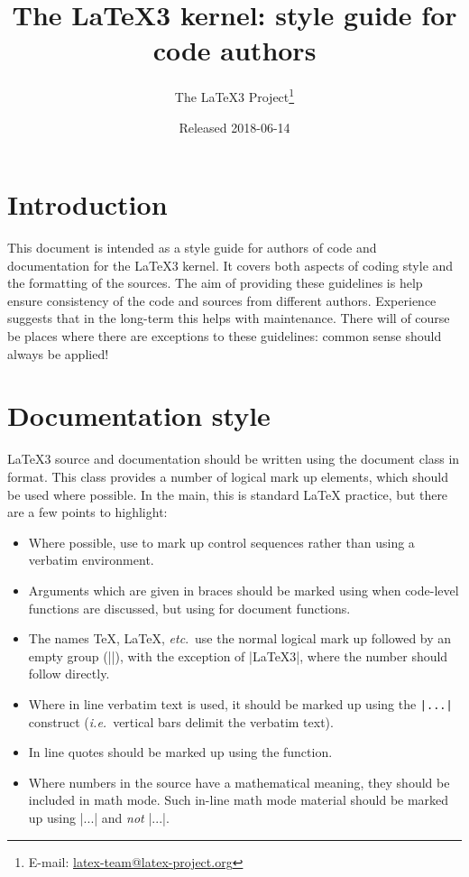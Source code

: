 \documentclass{l3doc}
\title{%
  The \LaTeX3 kernel: style guide for code authors%
}
\author{%
  The \LaTeX3 Project\thanks
    {%
      E-mail:
      \href{mailto:latex-team@latex-project.org}%
        {latex-team@latex-project.org}%
    }%
}
\date{Released 2018-06-14}
\begin{document}
\maketitle

\tableofcontents

\section{Introduction}

This document is intended as a style guide for authors of code and
documentation for the \LaTeX3 kernel. It covers both aspects of coding
style and the formatting of the sources. The aim of providing these
guidelines is help ensure consistency of the code and sources from
different authors. Experience suggests that in the long-term this helps
with maintenance. There will of course be places where there are
exceptions to these guidelines: common sense should always be
applied!

\section{Documentation style}

\LaTeX3 source and documentation should be written using the document
class  in  format. This class provides a number
of logical mark up elements, which should be used where possible.
In the main, this is standard \LaTeX{} practice, but there are a
few points to highlight:
\begin{itemize}
  \item
    Where possible, use  to mark up control sequences
    rather than using a verbatim environment.
  \item
    Arguments which are given in braces should be marked using
     when code-level functions are discussed, but using
     for document functions.
  \item
    The names \TeX{}, \LaTeX{}, \emph{etc}.\ use the normal logical mark
    up followed by an empty group (|{}|), with the exception of |\LaTeX3|,
    where the number should follow directly.
  \item
    Where in line verbatim text is used, it should be marked up
    using the \verb=|...|= construct (\emph{i.e.}~vertical bars delimit
    the verbatim text).
  \item In line quotes should be marked up using the 
    function.
  \item
    Where numbers in the source have a mathematical meaning,
    they should be included in math mode. Such in-line math mode
    material should be marked up using |$...$| and  \emph{not}
    |\(...\)|.
\end{itemize}
\end{document}
